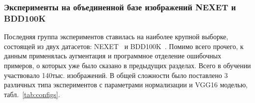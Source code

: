 \documentclass[11pt,a4paper]{extarticle}
\begin{document}
{			\newpage
			\subsubsection{Эксперименты на объединенной базе изображений NEXET и BDD100K}\label{sec:tests:nexet_bdd}
				
				Последняя группа экспериментов ставилась на наиболее крупной выборке, состоящей из двух датасетов: NEXET~\cite{data:nexet} и BDD100K~\cite{data:bdd100k}.
				Помимо всего прочего, к данным применялась аугментация и программное отделение ошибочных примеров, о которых уже было сказано в предыдущих разделах.
				Всего в обучении участвовало 140тыс. изображений.
				В общей сложности было поставлено 3 различных типа экспериментов с параметрами нормализации и VGG16 моделью, табл.~\ref{tab:configs}.

}
\end{document}
